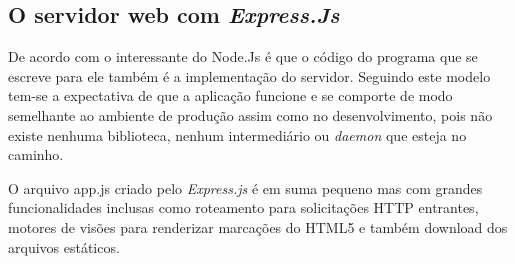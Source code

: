 \subsection{O servidor web com \textit{Express.Js}}
\label{servidor-web-express-js}

  
  De acordo com  o interessante do Node.Js é que o código do 
  programa que se escreve para ele também é a implementação do servidor. 
  Seguindo este modelo tem-se a expectativa de que a aplicação funcione e se comporte de modo semelhante 
  ao ambiente de produção assim como no desenvolvimento, pois não existe nenhuma biblioteca, nenhum intermediário 
  ou \textit{daemon} que esteja no caminho.
  
  O arquivo app.js criado pelo \textit{Express.js} é em suma pequeno mas com grandes funcionalidades inclusas como 
  roteamento para solicitações \ac{HTTP} entrantes, motores de visões para renderizar marcações do HTML5
  e também download dos arquivos estáticos.